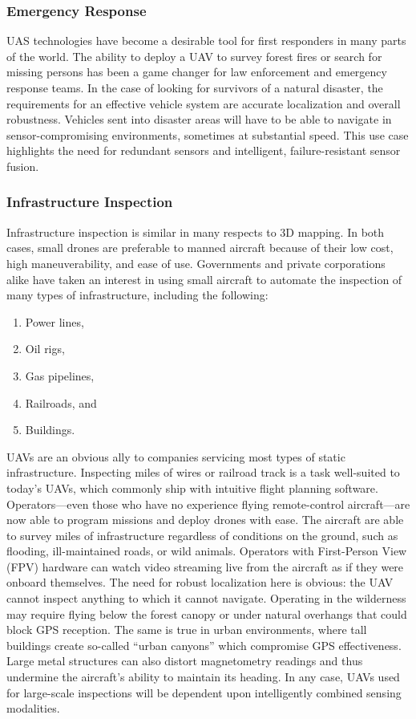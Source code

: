 \subsubsection{Emergency Response}

UAS technologies have become a desirable tool for first responders in many parts of the world. The ability to deploy a UAV to survey forest fires or search for missing persons has been a game changer for law enforcement and emergency response teams. In the case of looking for survivors of a natural disaster, the requirements for an effective vehicle system are accurate localization and overall robustness. Vehicles sent into disaster areas will have to be able to navigate in sensor-compromising environments, sometimes at substantial speed. This use case highlights the need for redundant sensors and intelligent, failure-resistant sensor fusion.

\subsubsection{Infrastructure Inspection}

Infrastructure inspection is similar in many respects to 3D mapping. In both cases, small drones are preferable to manned aircraft because of their low cost, high maneuverability, and ease of use. Governments and private corporations alike have taken an interest in using small aircraft to automate the inspection of many types of infrastructure, including the following:
\begin{enumerate}
    \item Power lines,
    \item Oil rigs,
    \item Gas pipelines,
    \item Railroads, and
    \item Buildings.
\end{enumerate}
UAVs are an obvious ally to companies servicing most types of static infrastructure. Inspecting miles of wires or railroad track is a task well-suited to today's UAVs, which commonly ship with intuitive flight planning software. Operators---even those who have no experience flying remote-control aircraft---are now able to program missions and deploy drones with ease. The aircraft are able to survey miles of infrastructure regardless of conditions on the ground, such as flooding, ill-maintained roads, or wild animals. Operators with First-Person View (FPV) hardware can watch video streaming live from the aircraft as if they were onboard themselves. The need for robust localization here is obvious: the UAV cannot inspect anything to which it cannot navigate. Operating in the wilderness may require flying below the forest canopy or under natural overhangs that could block GPS reception. The same is true in urban environments, where tall buildings create so-called ``urban canyons'' which compromise GPS effectiveness. Large metal structures can also distort magnetometry readings and thus undermine the aircraft's ability to maintain its heading. In any case, UAVs used for large-scale inspections will be dependent upon intelligently combined sensing modalities.

